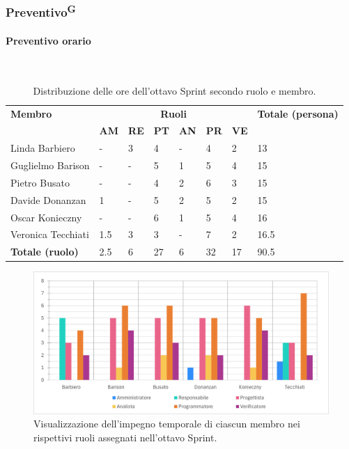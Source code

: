 \documentclass[8pt]{article}
\newcommand{\glossterm}[1]{#1\textsuperscript{G}} %
\newcommand{\subsubsubsection}[1]{\paragraph{#1}\mbox{}\\}
\begin{document}
\subsubsection{\glossterm{Preventivo}}
\subsubsubsection{Preventivo orario}
\begin{table}[ht!]
	\centering
	\begin{tabular}{p{4cm} p{1cm} p{1cm} p{1cm} p{1cm} p{1cm} p{1cm} p{3cm}}
		\toprule
        \textbf{Membro} & \multicolumn{6}{c}{\textbf{Ruoli}} & \textbf{Totale (persona)}\\
		& \textbf{AM} & \textbf{RE} & \textbf{PT} & \textbf{AN} & \textbf{PR} & \textbf{VE}\\
		\midrule
        Linda Barbiero          & -     & 3     & 4     & -     & 4     & 2     & 13 \\
        Guglielmo Barison       & -     & -     & 5     & 1     & 5     & 4 & 15 \\
        Pietro Busato           & -     & -     & 4     & 2     & 6     & 3     & 15 \\
        Davide Donanzan         & 1     & -     & 5     & 2     & 5     & 2     & 15 \\
        Oscar Konieczny         & -     & -     & 6     & 1     & 5     & 4     & 16 \\
        Veronica Tecchiati      & 1.5     & 3     & 3     & -     & 7     & 2     & 16.5 \\
        \bottomrule
        \textbf{Totale (ruolo)} & 2.5     & 6     & 27    & 6    & 32    & 17    & 90.5 \\
	\end{tabular}
	\caption{Distribuzione delle ore dell'ottavo Sprint secondo ruolo e membro.}
	\label{table:Distribuzione delle ore dell'ottavo Sprint secondo ruolo e membro}
\end{table}
\begin{figure}[ht!]
    \centering
    \includegraphics[width=15cm]{./images_pdp/istogramma_periodo_8.png}
    \caption{Visualizzazione dell'impegno temporale di ciascun membro nei rispettivi ruoli assegnati
    nell'ottavo Sprint.}
    \label{figure:Visualizzazione dell'impegno temporale di ciascun membro nei rispettivi ruoli
    assegnati nell'ottavo Sprint}
\end{figure}
\end{document}

